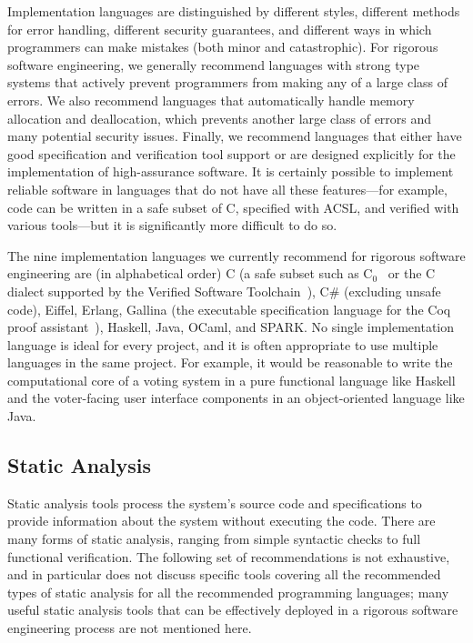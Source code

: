 Implementation languages are distinguished by different styles,
different methods for error handling, different security guarantees,
and different ways in which programmers can make mistakes (both minor
and catastrophic). For rigorous software engineering, we generally
recommend languages with strong type systems that actively prevent
programmers from making any of a large class of errors. We also
recommend languages that automatically handle memory allocation and
deallocation, which prevents another large class of errors and many
potential security issues. Finally, we recommend languages that either
have good specification and verification tool support or are designed
explicitly for the implementation of high-assurance software. It is
certainly possible to implement reliable software in languages that do
not have all these features---for example, code can be written in a
safe subset of C, specified with ACSL, and verified with various
tools---but it is significantly more difficult to do so.

The nine implementation languages we currently recommend for rigorous
software engineering are (in alphabetical order) C (a safe subset such
as C$_{0}$~\cite{C0} or the C dialect supported by the Verified
Software Toolchain~\cite{VST}), C\# (excluding unsafe code), Eiffel,
Erlang, Gallina (the executable specification language for the Coq
proof assistant~\cite{Coq}), Haskell, Java, OCaml, and SPARK. No
single implementation language is ideal for every project, and it is
often appropriate to use multiple languages in the same project. For
example, it would be reasonable to write the computational core of a
voting system in a pure functional language like Haskell and the
voter-facing user interface components in an object-oriented language
like Java.

\subsection{Static Analysis}

Static analysis tools process the system's source code and
specifications to provide information about the system without
executing the code.  There are many forms of static analysis, ranging
from simple syntactic checks to full functional verification. The
following set of recommendations is not exhaustive, and in particular
does not discuss specific tools covering all the recommended types of
static analysis for all the recommended programming languages; many
useful static analysis tools that can be effectively deployed in a
rigorous software engineering process are not mentioned here.


